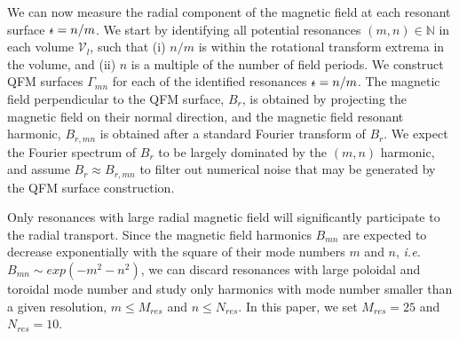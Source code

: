 \documentclass[my_thesis.tex]{subfiles}
\begin{document}
We can now measure the radial component of the magnetic field at each resonant surface $\text{$\iota\!\!$-}=n/m$. We start by identifying all potential resonances $(m,n)\in\mathbb{N}$ in each volume $\mathcal{V}_l$, such that (i) $n/m$ is within the rotational transform extrema in the volume, and (ii) $n$ is a multiple of the number of field periods. We construct QFM surfaces $\Gamma_{mn}$ for each of the identified resonances $\text{$\iota\!\!$-}=n/m$. The magnetic field perpendicular to the QFM surface, $ B_r$, is obtained by projecting  the magnetic field on their normal direction, and the magnetic field resonant harmonic, $ B_{r,mn}$ is obtained after a standard Fourier transform of $ B_r$. We expect the Fourier spectrum of $ B_r$ to be largely dominated by the $(m,n)$ harmonic, and assume $ B_r\approx B_{r,mn}$ to filter out numerical noise that may be generated by the QFM surface construction.

Only resonances with large radial magnetic field will significantly participate to the radial transport. Since the magnetic field harmonics $B_{mn}$ are expected to decrease exponentially with the square of their mode numbers $m$ and $n$, \textit{i.e.} $B_{mn}\sim exp(-m^2-n^2)$, we can discard resonances with large poloidal and toroidal mode number and study only harmonics with mode number smaller than a given resolution, $m\leq M_{res}$ and $n\leq N_{res}$. In this paper, we set $M_{res}=25$ and $N_{res}=10$. 
\end{document}
